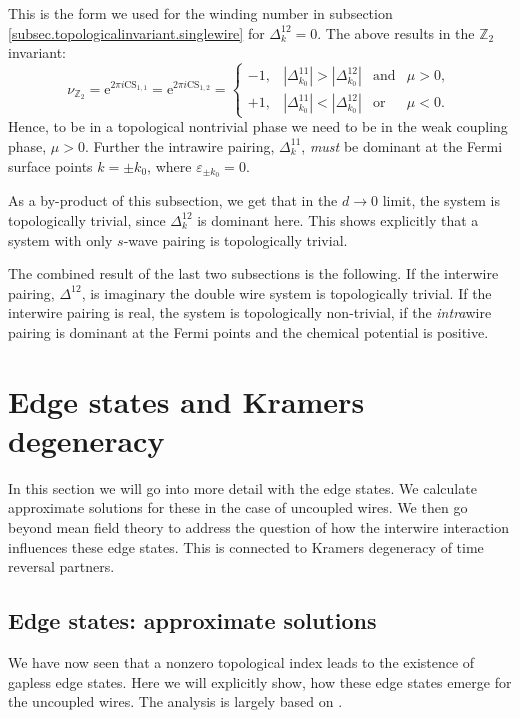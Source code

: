 This is the form we used for the winding number in subsection \ref{subsec.topologicalinvariant.singlewire} for $\Delta^{12}_k = 0$. The above results in the $\mathbb{Z}_2$ invariant:
\begin{equation}
\nu_{\mathbb{Z}_2} = \text{e}^{2\pi i \text{CS}_{1,1}} = \text{e}^{2\pi i \text{CS}_{1,2}} = \left\{ \begin{matrix} 
-1, & |\Delta^{11}_{k_0}| > |\Delta^{12}_{k_0}| & \text{and} & \mu > 0, \\
+1, & |\Delta^{11}_{k_0}| < |\Delta^{12}_{k_0}| & \text{or}  & \mu < 0.
  \end{matrix} \right.
\label{eq.CS11T2eqminus1}
\end{equation}
Hence, to be in a topological nontrivial phase we need to be in the weak coupling phase, $\mu > 0$. Further the intrawire pairing, $\Delta^{11}_k$, \textit{must} be dominant at the Fermi surface points $k = \pm k_0$, where $\varepsilon_{\pm k_0} = 0$. 

As a by-product of this subsection, we get that in the $d \to 0$ limit, the system is topologically trivial, since $\Delta^{12}_k$ is dominant here. This shows explicitly that a system with only $s$-wave pairing is topologically trivial. 

The combined result of the last two subsections is the following. If the interwire pairing, $\Delta^{12}$, is imaginary the double wire system is topologically trivial. If the interwire pairing is real, the system is topologically non-trivial, if the \textit{intra}wire pairing is dominant at the Fermi points and the chemical potential is positive. 

\section{Edge states and Kramers degeneracy} \label{sec.edgestatesandkramers}
In this section we will go into more detail with the edge states. We calculate approximate solutions for these in the case of uncoupled wires. We then go beyond mean field theory to address the question of how the interwire interaction influences these edge states. This is connected to Kramers degeneracy of time reversal partners.  

\subsection{Edge states: approximate solutions}
\label{subsec.2wiresedgestates}
We have now seen that a nonzero topological index leads to the existence of gapless edge states. Here we will explicitly show, how these edge states emerge for the uncoupled wires. The analysis is largely based on \cite[pp. 196-198]{BernevigTITSC}. 

